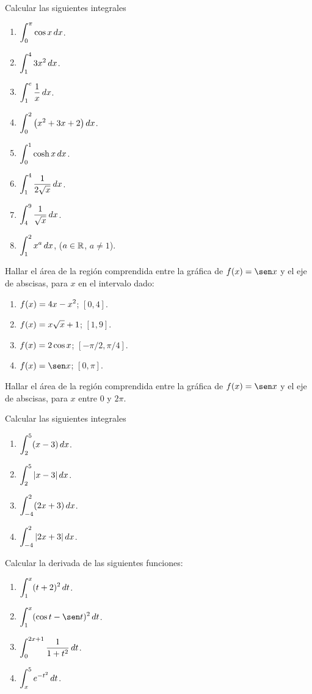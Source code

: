 \item Calcular las siguientes integrales
\begin{multicols}{2}
  \begin{enumerate}
    \item $\displaystyle \int_0^\pi \cos x \,dx$.
    \item $\displaystyle \int_1^4 3 x^2 \,dx$.
    \item $\displaystyle \int_1^e \frac1x \,dx$.
    \item $\displaystyle \int_0^2 \big( x^2+3x+2\big) \,dx$.
    \item $\displaystyle \int_0^1 \cosh x \,dx$.
    \item $\displaystyle \int_1^4 \frac{1}{2\sqrt{x}} \,dx$.
    \item $\displaystyle \int_4^9 \frac{1}{\sqrt x}\,dx$.
    \item $\displaystyle \int_1^2 x^a \,dx$, ($a\in \mathbb{R}$, $a\neq 1$).
  \end{enumerate}
\end{multicols}
\item Hallar el área de la región comprendida entre la gráfica de $f(x)=\sen x$ y el eje de abscisas, para $x$ en el intervalo dado:
\begin{multicols}{2}
  \begin{enumerate}
    \item $\displaystyle f(x)=4x-x^2$; $[0,4]$.
    \item $\displaystyle f(x)=x\sqrt{x}+1$; $[1,9]$.
    \item $\displaystyle f(x)=2\cos x$; $[-\pi/2,\pi/4]$.
    \item $\D f(x)=\sen x$; $[0,\pi]$.
  \end{enumerate}
\end{multicols}

\item Hallar el área de la región comprendida entre la gráfica de $f(x)=\sen x$ y el eje de abscisas, para $x$ entre $0$ y $2\pi$.
\item Calcular las siguientes integrales
\begin{multicols}{2}
  \begin{enumerate}
    \item $\displaystyle \int_2^5 (x-3) \,dx$.
    \item $\displaystyle \int_2^5 |x-3| \,dx$.
    \item $\displaystyle \int_{-4}^2 (2x+3) \,dx$.
    \item $\displaystyle \int_{-4}^2 |2x+3| \,dx$.
  \end{enumerate}
\end{multicols}

\item Calcular la derivada de las siguientes funciones:\begin{multicols}{2}
  \begin{enumerate}
    \item $\displaystyle \int_1^x (t+2)^2 \,dt$.
    \item $\D \int_1^x (\cos t-\sen t)^2 \dt$.
    \item $\displaystyle \int_0^{2x+1} \frac{1}{1+t^2} \,dt$.
    \item $\displaystyle \int_x^5 e^{-t^2} \,dt$.
  \end{enumerate}
\end{multicols}